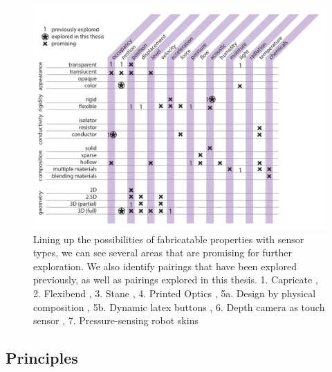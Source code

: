\begin{figure}
\centering
\includegraphics[width=6in]{figures/sensing-fab.pdf}
\caption{Lining up the possibilities of fabricatable properties with sensor types, we can see several areas that are promising for further exploration. We also identify pairings that have been explored previously, as well as pairings explored in this thesis. 1. Capricate \cite{schmitz-capricate}, 2. Flexibend \cite{chien-flexibend}, 3. Stane \cite{murray-smith-stane}, 4. Printed Optics \cite{willis-printedoptics}, 5a. Design by physical composition \cite{doering-composition}, 5b. Dynamic latex buttons \cite{harrison-buttons}, 6. Depth camera as touch sensor \cite{wilson-depthtouch}, 7. Pressure-sensing robot skins \cite{slyper-pressure}}
\label{fig:range}
\label{fig:sensing-fab}
\end{figure}

\subsection{Principles}
    
